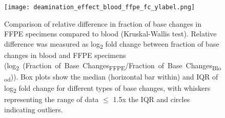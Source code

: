 
\begin{figure}[H]
	\centering
	\texttt{[image: deamination\_effect\_blood\_ffpe\_fc\_ylabel.png]}
	\caption[Comparison of relative difference in fraction of base changes in FFPE specimens compared to blood (Kruskal-Wallis test).]{Comparison of relative difference in fraction of base changes in FFPE specimens compared to blood (Kruskal-Wallis test). Relative difference was measured as log\textsubscript{2} fold change between fraction of base changes in blood and FFPE specimens \mbox{(log\textsubscript{2} (Fraction of Base Changes\textsubscript{FFPE}/Fraction of Base Changes\textsubscript{Blood}))}. Box plots show the median (horizontal bar within) and IQR of log\textsubscript{2} fold change for different types of base changes, with whiskers representing the range of data $\leq$ 1.5x the IQR and circles indicating outliers.}
	\label{fig:deamination_effect_blood_ffpe_fc}
\end{figure}


